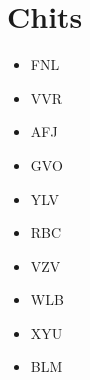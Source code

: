 \section{Chits}
\begin{itemize}
\item FNL
\item VVR
\item AFJ
\item GVO
\item YLV
\item RBC
\item VZV
\item WLB
\item XYU
\item BLM
\end{itemize}


 
